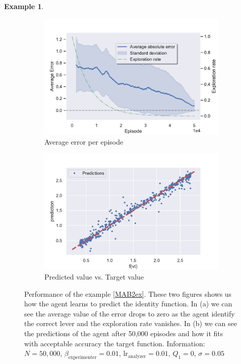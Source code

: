 \documentclass[11pt,a4paper,twoside]{report}
\newcommand{\+}{\textnormal{+} }
\theoremstyle{definition}
\newtheorem{myex}[mythm]{Example}
\numberwithin{equation}{chapter}
\begin{document}
\begin{myex}
  

    \begin{figure}[]
      \centering
      \begin{subfigure}{.5\textwidth}
        \centering
        \includegraphics[width=1\linewidth]{figures/Error-MAB2.pdf}
        \caption{Average error per episode}
        \label{fig:ErrorAverageMAB2}
      \end{subfigure}%
      \begin{subfigure}{.5\textwidth}
        \centering
        \includegraphics[width=1\linewidth]{figures/predictions-MAB2.pdf}
        \caption{Predicted value vs. Target value}
        \label{fig:predictionsMAB2}
      \end{subfigure}
      \caption{Performance of the example \ref{MAB2ex}. These two figures shows
      us how the agent learns to predict the identity function. In (a) we can see
      the average value of the error drops to zero as the agent identify
      the correct lever and the exploration rate vanishes. In (b) we can see the
      predictions of the agent after 50,000 episodes and how it fits with
      acceptable accuracy the target function. Information: $N=50,000$,
      $\beta_\text{experimenter}=0.01$, $\text{lr}_\text{analyzer}=0.01$,
      $Q_1=0$, $\sigma=0.05$}
    \end{figure} 
  \end{myex}
\end{document}
